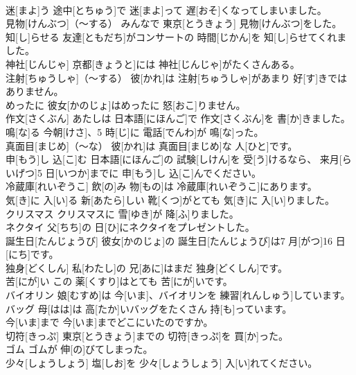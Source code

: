 \documentclass[8pt]{extreport}
\begin{document}
\begin{CJK}{UTF8}{min}
\\	迷[まよ]う	途中[とちゅう]で 迷[まよ]って 遅[おそ]くなってしまいました。		
\\	見物[けんぶつ]（～する）	みんなで 東京[とうきょう] 見物[けんぶつ]をした。		
\\	知[し]らせる	友達[ともだち]がコンサートの 時間[じかん]を 知[し]らせてくれました。		
\\	神社[じんじゃ]	京都[きょうと]には 神社[じんじゃ]がたくさんある。		
\\	注射[ちゅうしゃ]（～する）	彼[かれ]は 注射[ちゅうしゃ]があまり 好[す]きではありません。		
\\	めったに	彼女[かのじょ]はめったに 怒[おこ]りません。		
\\	作文[さくぶん]	あたしは 日本語[にほんご]で 作文[さくぶん]を 書[か]きました。		
\\	鳴[な]る	今朝[けさ]、5 時[じ]に 電話[でんわ]が 鳴[な]った。		
\\	真面目[まじめ]（～な）	彼[かれ]は 真面目[まじめ]な 人[ひと]です。		
\\	申[もう]し 込[こ]む	日本語[にほんご]の 試験[しけん]を 受[う]けるなら、 来月[らいげつ]5 日[いつか]までに 申[もう]し 込[こ]んでください。		
\\	冷蔵庫[れいぞうこ]	飲[の]み 物[もの]は 冷蔵庫[れいぞうこ]にあります。		
\\	気[き]に 入[い]る	新[あたら]しい 靴[くつ]がとても 気[き]に 入[い]りました。		
\\	クリスマス	クリスマスに 雪[ゆき]が 降[ふ]りました。		
\\	ネクタイ	父[ちち]の 日[ひ]にネクタイをプレゼントした。		
\\	誕生日[たんじょうび]	彼女[かのじょ]の 誕生日[たんじょうび]は7 月[がつ]16 日[にち]です。		
\\	独身[どくしん]	私[わたし]の 兄[あに]はまだ 独身[どくしん]です。		
\\	苦[にが]い	この 薬[くすり]はとても 苦[にが]いです。		
\\	バイオリン	娘[むすめ]は 今[いま]、バイオリンを 練習[れんしゅう]しています。		
\\	バッグ	母[はは]は 高[たか]いバッグをたくさん 持[も]っています。		
\\	今[いま]まで	今[いま]までどこにいたのですか。		
\\	切符[きっぷ]	東京[とうきょう]までの 切符[きっぷ]を 買[か]った。		
\\	ゴム	ゴムが 伸[の]びてしまった。		
\\	少々[しょうしょう]	塩[しお]を 少々[しょうしょう] 入[い]れてください。		

\end{CJK}
\end{document}
